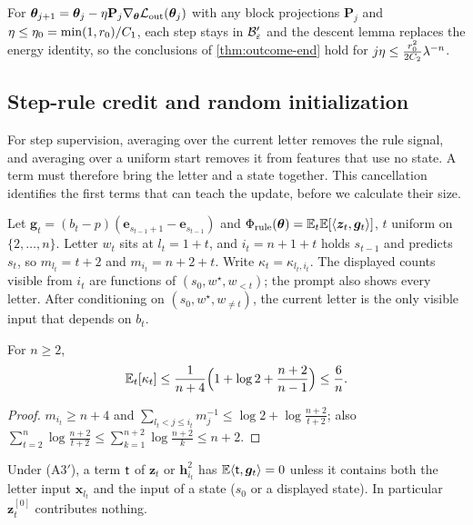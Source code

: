 \begin{remark}
\label{rem:flow}
For $\bm\theta_{j+1}=\bm\theta_j-\eta\mathbf P_j\nabla_{\bm\theta}\mathcal L_{\mathrm{out}}(\bm\theta_j)$ with any block projections $\mathbf P_j$ and $\eta\le\eta_0=\min(1,r_0)/C_1$, each step stays in
$\mathcal B_{\varepsilon}'$ and the descent lemma replaces the energy identity, so the conclusions of \cref{thm:outcome-end} hold for $j\eta\le\frac{r_0^2}{2C_2}\lambda^{-n}$.
\end{remark}

\subsection{Step-rule credit and random initialization}

For step supervision, averaging over the current letter removes the rule signal, and averaging over a uniform start removes it
from features that use no state. A term must therefore bring the letter and a state together. This cancellation identifies the
first terms that can teach the update, before we calculate their size.

Let $\bm g_t=(b_t-p)(\bm e_{s_{t-1}+1}-\bm e_{s_{t-1}})$ and $\Phi_{\mathrm{rule}}(\bm\theta)=\mathbb E_t\mathbb E[\langle\bm z_t,\bm g_t\rangle]$, $t$ uniform on $\{2,\ldots,n\}$. Letter $w_t$ sits at
$l_t=1+t$, and $i_t=n+1+t$ holds $s_{t-1}$ and predicts $s_t$, so $m_{l_t}=t+2$ and $m_{i_t}=n+2+t$. Write $\kappa_t=\kappa_{l_t,i_t}$. The displayed counts visible from $i_t$
are functions of $(s_0,w^\star,w_{<t})$; the prompt also shows every letter. After conditioning on $(s_0,w^\star,w_{\ne t})$, the current letter is the
only visible input that depends on $b_t$.

\begin{lemma}
\label{lem:dilution-average}
For $n\ge2$,
\begin{equation}
 \mathbb E_t[\kappa_t]\le\frac{1}{n+4}\Bigl(1+\log2+\frac{n+2}{n-1}\Bigr)\le\frac{6}{n} .
 \label{eq:dilution-avg}
\end{equation}
\end{lemma}

\begin{proof}
$m_{i_t}\ge n+4$ and $\sum_{l_t<j\le i_t}m_j^{-1}\le\log2+\log\frac{n+2}{t+2}$; also $\sum_{t=2}^n\log\frac{n+2}{t+2}\le\sum_{k=1}^{n+2}\log\frac{n+2}{k}\le n+2$.
\end{proof}

\begin{lemma}
\label{lem:rule-sites}
Under (A3$'$), a term $\mathsf t$ of $\bm z_t$ or $\bm h^2_{i_t}$ has $\mathbb E\langle\mathsf t,\bm g_t\rangle=0$ unless it contains both the letter input $\bm x_{l_t}$ and the input of a
state ($s_0$ or a displayed state). In particular $\bm z^{[0]}_t$ contributes nothing.
\end{lemma}

